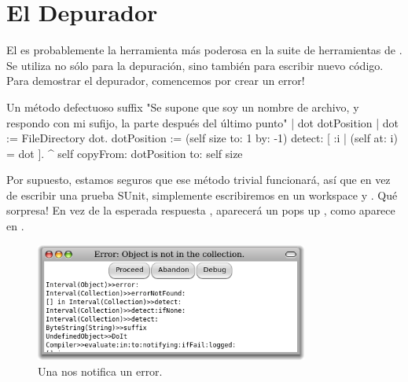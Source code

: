 \documentclass[spanish,a4paper,10pt,twoside]{book}
\begin{document}
\section{El Depurador}

El  es probablemente la herramienta m\'as poderosa en la suite de herramientas de \pharo.  Se utiliza no s\'olo para la depuraci\'on, sino tambi\'en para escribir nuevo c\'odigo.
Para demostrar el depurador, comencemos por crear un error!


\begin{method}[buggy]{Un m\'etodo defectuoso}
suffix
	"Se supone que soy un nombre de archivo, y respondo con mi sufijo, la parte despu\'es del \'ultimo punto"
	| dot dotPosition |
	dot := FileDirectory dot.
	dotPosition := (self size to: 1 by: -1) detect: [ :i | (self at: i) = dot ].
	^ self copyFrom: dotPosition to: self size
\end{method}

Por supuesto, estamos seguros que ese m\'etodo trivial funcionar\'a, as\'i que en vez de escribir una prueba SUnit, simplemente escribiremos
 en un workspace y .
Qu\'e sorpresa!  En vez de la esperada respuesta , aparecer\'a un pops up , como aparece en .

\begin{figure}[btp]
	\begin{center}
	\includegraphics[width=0.8\textwidth]{PreDebugWindow}
	\end{center}
	\caption{Una  nos notifica un error.}
\end{figure}
\end{document}
